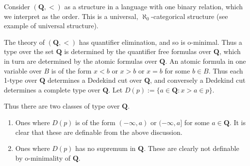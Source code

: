 \documentclass[12pt]{article}
\begin{document}
Consider $(\mathbf{Q},<)$ as a structure in a language with one binary relation, which we interpret as the order. 
This is a universal, $\aleph_{0}$-categorical structure (see example of universal structure).

The theory of $(\mathbf{Q},<)$ has quantifier elimination, and so is o-minimal. 
Thus a type over the set $\mathbf{Q}$ is determined by the quantifier free formulas over $\mathbf{Q}$, which in turn are determined by the atomic formulas over $\mathbf{Q}$.
An atomic formula in one variable over $B$ is of the form $x<b$ or $x>b$ or $x=b$ for some $b \in B$. 
Thus each 1-type over $\mathbf{Q}$ determines a Dedekind cut over  $\mathbf{Q}$, and conversely a Dedekind cut determines a complete type over $\mathbf{Q}$. 
Let $D(p):=\{a \in \mathbf{Q}:x>a \in p\}$.

\medskip

Thus there are two classes of type over $\mathbf{Q}$. 
\begin{enumerate}\item Ones where $D(p)$ is of the form $(- \infty,a)$  or $(-\infty,a]$ for some $a \in \mathbf{Q}$. It is clear that these are definable from the above discussion.
\item Ones where $D(p)$ has no supremum in $\mathbf{Q}$. These are clearly not definable by o-minimality of $\mathbf{Q}$.
\end{enumerate}
\end{document}
